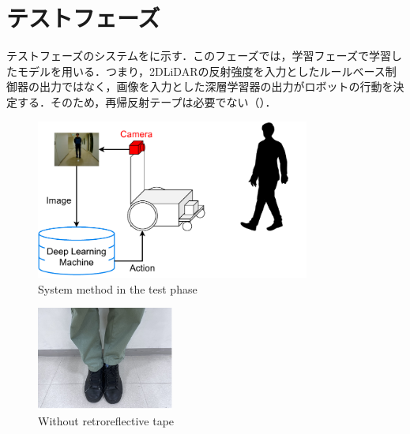 
\section{テストフェーズ}

  テストフェーズのシステムをに示す．このフェーズでは，学習フェーズで学習したモデルを用いる．つまり，2DLiDARの反射強度を入力としたルールベース制御器の出力ではなく，画像を入力とした深層学習器の出力がロボットの行動を決定する．そのため，再帰反射テープは必要でない（）．

  \vspace{0.5cm}

  \begin{figure}[h]
    \centering
    \includegraphics[width=9cm] {images/pdf/RobotGuidance_test_system}
    \captionsetup{justification=raggedright} %
    \caption{System method in the test phase}
    \label{Fig:RobotGuidance_following_system}
  \end{figure}

  \vspace{0.5cm}

  \begin{figure}[h]
    \centering
    \includegraphics[width=4.5cm] {images/pdf/RobotGuidance_test_phase_leg}
    \captionsetup{justification=raggedright} %
    \caption{Without retroreflective tape}
    \label{Fig:RobotGuidance_following_phase_leg}
  \end{figure}

\newpage
